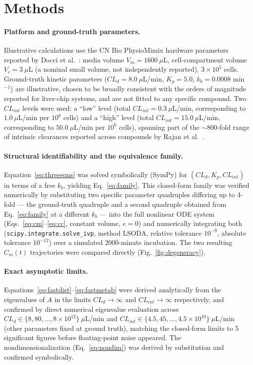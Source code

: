 \section*{Methods}

\paragraph{Platform and ground-truth parameters.} Illustrative calculations use the CN Bio PhysioMimix hardware parameters reported by Docci et al.\ \citep{docci2022}: media volume $V_m = 1600\ \mu$L, cell-compartment volume $V_c = 3\ \mu$L (a nominal small volume, not independently reported), $3\times10^5$ cells. Ground-truth kinetic parameters ($CL_d = 8.0\ \mu$L/min, $K_p = 5.0$, $k_b = 0.0008$ min$^{-1}$) are illustrative, chosen to be broadly consistent with the orders of magnitude reported for liver-chip systems, and are not fitted to any specific compound. Two $CL_{int}$ levels were used: a ``low'' level (total $CL_{int} = 0.3\ \mu$L/min, corresponding to $1.0\ \mu$L/min per $10^6$ cells) and a ``high'' level (total $CL_{int} = 15.0\ \mu$L/min, corresponding to $50.0\ \mu$L/min per $10^6$ cells), spanning part of the $\sim$800-fold range of intrinsic clearances reported across compounds by Rajan et al.\ \citep{rajan2023}.

\paragraph{Structural identifiability and the equivalence family.} Equation~\eqref{eq:threeeqns} was solved symbolically (SymPy) for $(CL_d, K_p, CL_{int})$ in terms of a free $k_b$, yielding Eq.~\eqref{eq:family}. This closed-form family was verified numerically by substituting two specific parameter quadruples differing up to 4-fold --- the ground-truth quadruple and a second quadruple obtained from Eq.~\eqref{eq:family} at a different $k_b$ --- into the full nonlinear ODE system (Eqs.~\eqref{eq:cm}--\eqref{eq:cc}, constant volume, $e=0$) and numerically integrating both (\texttt{scipy.integrate.solve\_ivp}, method LSODA, relative tolerance $10^{-9}$, absolute tolerance $10^{-12}$) over a simulated 2000-minute incubation. The two resulting $C_m(t)$ trajectories were compared directly (Fig.~\ref{fig:degeneracy}).

\paragraph{Exact asymptotic limits.} Equations~\eqref{eq:fastdist}--\eqref{eq:fastmetab} were derived analytically from the eigenvalues of $A$ in the limits $CL_d\to\infty$ and $CL_{int}\to\infty$ respectively, and confirmed by direct numerical eigenvalue evaluation across $CL_d \in \{8, 80, \dots, 8\times10^{12}\}\ \mu$L/min and $CL_{int} \in \{4.5, 45, \dots, 4.5\times10^{10}\}\ \mu$L/min (other parameters fixed at ground truth), matching the closed-form limits to 5 significant figures before floating-point noise appeared. The nondimensionalization (Eq.~\eqref{eq:nondim}) was derived by substitution and confirmed symbolically.

